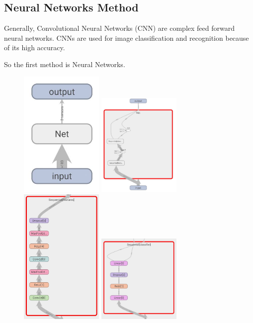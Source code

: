 \documentclass{article}
\begin{document}
  \subsection{Neural Networks Method}
  Generally, Convolutional Neural Networks (CNN) are complex feed forward neural networks. CNNs are used for image classification and recognition because of its high accuracy.

  So the first method is Neural Networks.
  \begin{figure}[!htbp]
      \includegraphics[width=4cm]{structure1.JPG}
    \endminipage\hfill
      \includegraphics[width=4cm]{structure2.JPG}
    \endminipage\hfill
      \includegraphics[width=4cm]{structure4.JPG}
    \endminipage\hfill
      \includegraphics[width=4cm]{structure3.JPG}
    \endminipage
    \end{figure}
\end{document}
